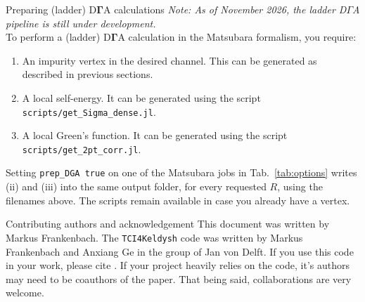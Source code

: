 \documentclass[12pt]{article}
\begin{document}
\begin{section}{Preparing (ladder) D$\boldsymbol{\Gamma}$A calculations}
\label{sec:DGammaA}
\textit{Note: As of November 2026, the ladder D$\Gamma$A pipeline is still under development.}\\
To perform a (ladder) D$\boldsymbol{\Gamma}$A calculation in the Matsubara formalism, you require:
\begin{enumerate}
\item[(i)] An impurity vertex in the desired channel. This can be generated
as described in previous sections.
\item[(ii)] A local self-energy. It can be generated using the script \texttt{scripts/get\_Sigma\_dense.jl}.
\item[(iii)] A local Green's function. It can be generated using the script \texttt{scripts/get\_2pt\_corr.jl}.
\end{enumerate}
Setting \texttt{prep\_DGA true} on one of the Matsubara jobs in
Tab.~\ref{tab:options} writes (ii) and (iii) into the same output folder,
for every requested $R$, using the filenames above.
The scripts remain available in case you already have a vertex.
\end{section}

\begin{section}{Contributing authors and acknowledgement}
This document was written by Markus Frankenbach. The \texttt{TCI4Keldysh} code was
written by Markus Frankenbach and Anxiang Ge in the group of Jan von Delft.
If you use this code in your work, please cite \cite{Frankenbach2025}. If your project heavily relies on the code, it's
authors may need to be coauthors of the paper. That being said, collaborations are very welcome.
\end{section}

\nocite{*}


\end{document}
